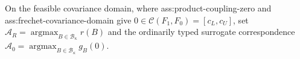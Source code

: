 On the feasible covariance domain, where ass:product-coupling-zero and ass:frechet-covariance-domain give \(0\in\mathcal C(F_1,F_0)=[c_L,c_U]\), set \(\mathcal A_R=\operatorname*{argmax}_{B\in\mathcal B_\kappa}r(B)\) and the ordinarily typed surrogate correspondence \(\mathcal A_0=\operatorname*{argmax}_{B\in\mathcal B_\kappa}g_B(0)\).